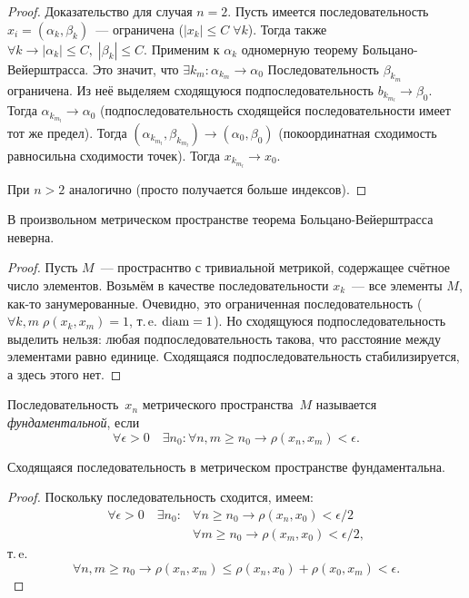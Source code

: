 \begin{proof}
Доказательство для случая \(n = 2\). Пусть имеется последовательность \(x_i = (\alpha_k,
\beta_k)\)~--- ограничена (\(|x_k| \leq C \; \forall k\)). Тогда также \(\forall k \rightarrow
|\alpha_k| \leq C, \; |\beta_k| \leq C\). Применим к \(\alpha_k\) одномерную теорему
Больцано-Вейерштрасса. Это значит, что \(\exists k_m \colon \alpha_{k_m} \rightarrow \alpha_0\)
Последовательность \(\beta_{k_m}\) ограничена. Из неё выделяем сходящуюся подпоследовательность
\(b_{k_{m_l}} \rightarrow \beta_0\). Тогда \(\alpha_{k_{m_l}} \rightarrow \alpha_0\)
(подпоследовательность сходящейся последовательности имеет тот же предел). Тогда \((\alpha_{k_{m_l}},
\beta_{k_{m_l}}) \rightarrow (\alpha_0, \beta_0)\) (покоординатная сходимость равносильна сходимости
точек). Тогда \(x_{k_{m_l}} \rightarrow x_0\).

При \(n > 2\) аналогично (просто получается больше индексов).
\end{proof}

В произвольном метрическом пространстве теорема Больцано-Вейерштрасса неверна.

\begin{proof}
Пусть \(M\)~--- простраснтво с тривиальной метрикой, содержащее счётное число элементов. Возьмём в
качестве последовательности \(x_k\)~--- все элементы \(M\), как-то занумерованные. Очевидно, это
ограниченная последовательность (\(\forall k, m \; \rho(x_k, x_m) = 1\), т.\,e. \(\diam \hm = 1\)).
Но сходящуюся подпоследовательность выделить нельзя: любая подпоследовательность такова, что
расстояние между элементами равно единице. Сходящаяся подпоследовательность стабилизируется, а здесь
этого нет.
\end{proof}

\begin{definition}
Последовательность~\(x_n\) метрического пространства~\(M\) называется \textit{фундаментальной}, если
\[
    \forall \epsilon > 0 \quad \exists n_0 \colon \forall n, m \geq n_0 \rightarrow \rho(x_n, x_m) <
        \epsilon.
\]
\end{definition}

\begin{statement}
Сходящаяся последовательность в метрическом пространстве фундаментальна.
\end{statement}

\begin{proof}
Поскольку последовательность сходится, имеем:
\begin{align}
    \forall \epsilon > 0 \quad \exists n_0 \colon &\forall n \geq n_0 \rightarrow \rho(x_n, x_0) <
        \epsilon / 2\\
    &\forall m \geq n_0 \rightarrow \rho(x_m, x_0) < \epsilon / 2,
\end{align}
т.\,e.
\[
    \forall n, m \geq n_0 \rightarrow \rho(x_n, x_m) \leq \rho(x_n, x_0) + \rho(x_0, x_m) <
        \epsilon.
\]
\end{proof}

